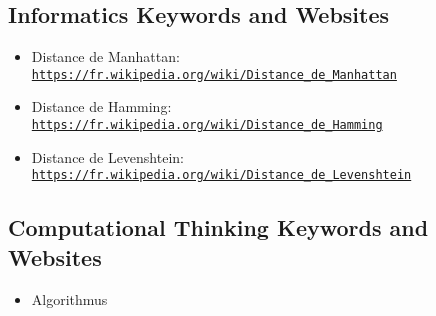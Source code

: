 \documentclass[a4paper,11pt]{report}
\newcommand{\BrochureUrlText}[1]{\texttt{#1}}
\begin{document}
\subsection*{Informatics Keywords and Websites}

\begin{itemize}
  \item Distance de Manhattan: \href{https://fr.wikipedia.org/wiki/Distance_de_Manhattan}{\BrochureUrlText{https://fr.wikipedia.org/wiki/Distance\_de\_Manhattan}}
  \item Distance de Hamming: \href{https://fr.wikipedia.org/wiki/Distance_de_Hamming}{\BrochureUrlText{https://fr.wikipedia.org/wiki/Distance\_de\_Hamming}}
  \item Distance de Levenshtein: \href{https://fr.wikipedia.org/wiki/Distance_de_Levenshtein}{\BrochureUrlText{https://fr.wikipedia.org/wiki/Distance\_de\_Levenshtein}}
\end{itemize}


\subsection*{Computational Thinking Keywords and Websites}

\begin{itemize}
  \item Algorithmus
\end{itemize}
\end{document}

